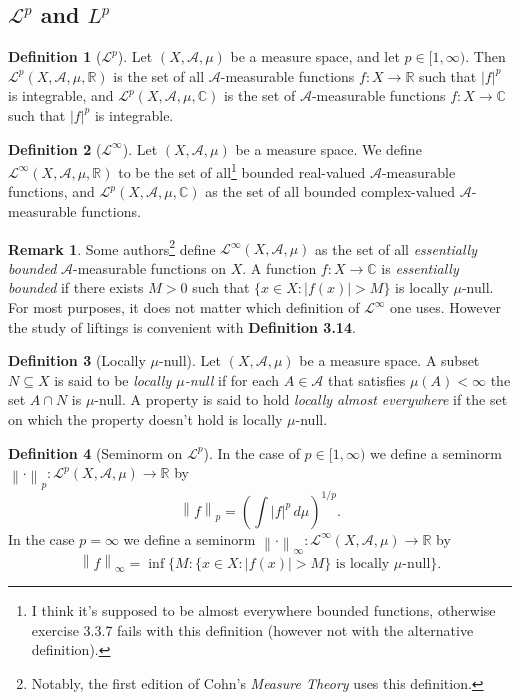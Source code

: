 \documentclass[12pt]{article}
\theoremstyle{definition}
\newtheorem{definition}{Definition}[section]
\newtheorem*{remark}{Remark}
\newcommand{\real}{\mathbb{R}}   %
\newcommand{\C}{\mathbb{C}}    %
\newcommand{\algebra}{\mathscr{A}}
\renewcommand{\L}{\mathscr{L}}
\newcommand\norm[1]{\left\lVert#1\right\rVert}
\begin{document}
\subsection{$\L^p$ and $L^p$}
\begin{definition}[$\mathscr{L}^p$]
    Let $(X,\algebra,\mu)$ be a measure space, and let $p\in [1,\infty)$. Then $\mathscr{L}^p(X,\algebra,\mu,\real)$ is the set of all $\algebra$-measurable functions $f:X\to \real$ such that $|f|^p$ is integrable, and $\mathscr{L}^p(X,\algebra,\mu,\C)$ is the set of $\algebra$-measurable functions $f:X\to\C$ such that $|f|^p$ is integrable.
\end{definition}
\begin{definition}[$\L^\infty$]
    Let $(X,\algebra,\mu)$ be a measure space. We define $\L^\infty(X,\algebra,\mu,\real)$ to be the set of all\footnote{I think it's supposed to be almost everywhere bounded functions, otherwise exercise 3.3.7 fails with this definition (however not with the alternative definition).} bounded real-valued $\algebra$-measurable functions, and $\L^p(X,\algebra,\mu,\C)$ as the set of all bounded complex-valued $\algebra$-measurable functions.
\end{definition}
\begin{remark}
    Some authors\footnote{Notably, the first edition of Cohn's \textit{Measure Theory} uses this definition.} define $\L^\infty(X,\algebra,\mu)$ as the set of all \textit{essentially bounded} $\algebra$-measurable functions on $X$. A function $f:X\to \C$ is \textit{essentially bounded} if there exists $M>0$ such that $\{x\in X: |f(x)|>M\}$ is locally $\mu$-null. For most purposes, it does not matter which definition of $\L^\infty$ one uses. However the study of liftings is convenient with \textbf{Definition 3.14}.
\end{remark}
\begin{definition}[Locally $\mu$-null]
    Let $(X,\algebra,\mu)$ be a measure space. A subset $N\subseteq X$ is said to be \textit{locally $\mu$-null} if for each $A\in\algebra$ that satisfies $\mu(A)<\infty$ the set $A\cap N$ is $\mu$-null. A property is said to hold \textit{locally almost everywhere} if the set on which the property doesn't hold is locally $\mu$-null.
\end{definition}
\begin{definition}[Seminorm on $\L^p$]
    In the case of $p\in [1,\infty)$ we define a seminorm $\norm{\cdot}_p:\L^p(X,\algebra,\mu)\to\real$ by
    \begin{equation*}
        \norm{f}_p=\left(\int |f|^p \, d\mu \right)^{1/p}.
    \end{equation*}
    In the case $p=\infty$ we define a seminorm $\norm{\cdot}_\infty:\L^\infty(X,\algebra,\mu)\to \real$ by
    \begin{equation*}
        \norm{f}_\infty = \inf \big\{ M: \{x\in X: |f(x)|>M\} \text{ is locally $\mu$-null}\big\}.
    \end{equation*}
\end{definition}
\end{document}
